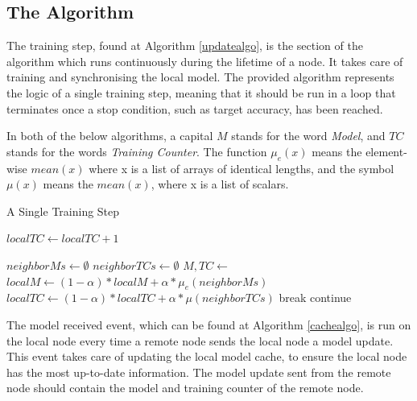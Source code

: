 \documentclass[letterpaper, 10 pt, conference]{ieeeconf}  %
\begin{document}
\subsection{The Algorithm}
The training step, found at Algorithm \ref{updatealgo}, is the section of the algorithm which runs continuously during the lifetime of a node. It takes care of training and synchronising the local model. The provided algorithm represents the logic of a single training step, meaning that it should be run in a loop that terminates once a stop condition, such as target accuracy, has been reached.

In both of the below algorithms, a capital $M$ stands for the word \emph{Model}, and $TC$ stands for the words \emph{Training Counter}. The function $\mu_e(x)$ means the element-wise $mean(x)$ where x is a list of arrays of identical lengths, and the symbol $\mu(x)$ means the $mean(x)$, where x is a list of scalars.

\begin{algorithm}[H]
	\caption{A Single Training Step} \label{updatealgo}
	\label{mainalgo}
	\begin{algorithmic}[1]
		\State {}
		\State $localTC \gets localTC + 1$
		\State {}
		\EndFor
		
		\State $neighborMs \gets \emptyset$
		\State $neighborTCs \gets \emptyset$
		\State $M, TC \gets$ 
		\State {}
		\State {}
		\EndIf
		\EndFor
		\State $localM \gets (1 - \alpha) * localM + \alpha * \mu_e(neighborMs)$ \label{updatelm}
		\State $localTC \gets (1 - \alpha) * localTC + \alpha * \mu(neighborTCs)$ \label{updatetc}
		\State break
		\Else
		\State {}
		\State continue
		\EndIf
		\EndFor
	\end{algorithmic}
\end{algorithm}

The model received event, which can be found at Algorithm \ref{cachealgo}, is run on the local node every time a remote node sends the local node a model update. This event takes care of updating the local model cache, to ensure the local node has the most up-to-date information. The model update sent from the remote node should contain the model and training counter of the remote node.
\end{document}
